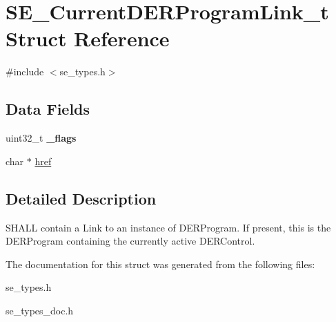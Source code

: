 \hypertarget{structSE__CurrentDERProgramLink__t}{}\section{S\+E\+\_\+\+Current\+D\+E\+R\+Program\+Link\+\_\+t Struct Reference}
\label{structSE__CurrentDERProgramLink__t}


{\ttfamily \#include $<$se\+\_\+types.\+h$>$}

\subsection*{Data Fields}
\begin{DoxyCompactItemize}
\item 
uint32\+\_\+t {\bfseries \+\_\+flags}
\item 
char $\ast$ \hyperlink{group__CurrentDERProgramLink_ga400d4470ff1d8304328473fce9736eca}{href}
\end{DoxyCompactItemize}


\subsection{Detailed Description}
S\+H\+A\+LL contain a Link to an instance of D\+E\+R\+Program. If present, this is the D\+E\+R\+Program containing the currently active D\+E\+R\+Control. 

The documentation for this struct was generated from the following files\+:\begin{DoxyCompactItemize}
\item 
se\+\_\+types.\+h\item 
se\+\_\+types\+\_\+doc.\+h\end{DoxyCompactItemize}
